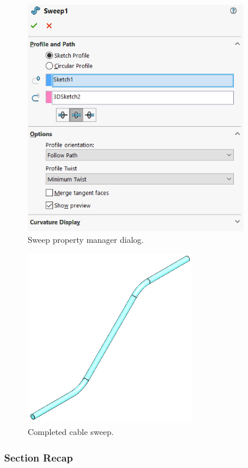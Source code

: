 \begin{figure}[H]
\begin{center}
  \includegraphics[height=4in]{images/figures/sweep-feature-tree.png}
\end{center}
\caption{Sweep property manager dialog. \label{fig:sweep-feature-tree}}

\end{figure}

\begin{figure}[H]
\begin{center}
  \includegraphics[height=3in]{images/figures/completed-cable-sweep.png}
\end{center}
\caption{Completed cable sweep.
\label{fig:completed-cable-sweep}}

\end{figure}

\subsubsection{Section Recap}

